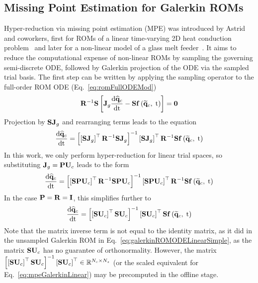\subsection{Missing Point Estimation for Galerkin ROMs}

Hyper-reduction via missing point estimation (MPE) was introduced by Astrid and coworkers, first for ROMs of a linear time-varying 2D heat conduction problem~\cite{Astrid2004} and later for a non-linear model of a glass melt feeder~\cite{Astrid2008}. It aims to reduce the computational expense of non-linear ROMs by sampling the governing semi-discrete ODE, followed by Galerkin projection of the ODE via the sampled trial basis. The first step can be written by applying the sampling operator to the full-order ROM ODE (Eq.~\ref{eq:romFullODEMod})
%
\begin{equation}
    \resScaleInv \sampMat \left[\jacobDecode \ode{\consVecCoef}{\timeVar} - \sampMat \rhsFunc{\consVecRom, \; \timeVar}\right] = \zeroVec
\end{equation}
%
Projection by $\mathbf{S} \mathbf{J}_{g}$ and rearranging terms leads to the equation
%
\begin{equation}
	\ode{\consVecCoef}{\timeVar} = \left[ \left[\sampMat \jacobDecode\right]^\top \resScaleInv \sampMat \jacobDecode\right]^{-1} \left[\sampMat \jacobDecode\right]^\top \resScaleInv \sampMat \rhsFunc{\consVecRom, \; \timeVar}
\end{equation}
%
In this work, we only perform hyper-reduction for linear trial spaces, so substituting $\jacobDecode = \consScale \consTrial$ leads to the form
%
\begin{equation}\label{eq:mpeGalerkinLinear}
	\ode{\consVecCoef}{\timeVar} = \left[ \left[\sampMat \consScale \consTrial \right]^\top \resScaleInv \sampMat \consScale \consTrial \right]^{-1} \left[\sampMat \consScale \consTrial \right]^\top \resScaleInv \sampMat \rhsFunc{\consVecRom, \; \timeVar}
\end{equation}
%
In the case $\consScale = \resScale = \identMat$, this simplifies further to
%
\begin{equation}
	\ode{\consVecCoef}{\timeVar} = \left[ \left[\sampMat \consTrial \right]^\top \sampMat \consTrial \right]^{-1} \left[\sampMat \consTrial \right]^\top \sampMat \rhsFunc{\consVecRom, \; \timeVar}
\end{equation}
%
Note that the matrix inverse term is not equal to the identity matrix, as it did in the unsampled Galerkin ROM in Eq.~\ref{eq:galerkinROMODELinearSimple}, as the matrix $\sampMat \consTrial$ has no guarantee of orthonormality. However, the matrix $\left[ \left[\sampMat \consTrial \right]^\top \sampMat \consTrial \right]^{-1} \left[\sampMat \consTrial \right]^\top \inRTwo{\numConsModes}{\numSamps}$ (or the scaled equivalent for Eq.~\ref{eq:mpeGalerkinLinear}) may be precomputed in the offline stage.

